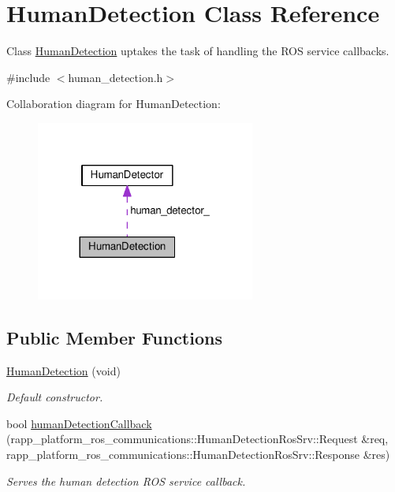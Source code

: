 \hypertarget{classHumanDetection}{\section{Human\-Detection Class Reference}
\label{classHumanDetection}
}


Class \hyperlink{classHumanDetection}{Human\-Detection} uptakes the task of handling the R\-O\-S service callbacks.  




{\ttfamily \#include $<$human\-\_\-detection.\-h$>$}



Collaboration diagram for Human\-Detection\-:
\nopagebreak
\begin{figure}[H]
\begin{center}
\leavevmode
\includegraphics[width=204pt]{classHumanDetection__coll__graph}
\end{center}
\end{figure}
\subsection*{Public Member Functions}
\begin{DoxyCompactItemize}
\item 
\hyperlink{classHumanDetection_a81054415c4dbe7f9f13789f10075b322}{Human\-Detection} (void)
\begin{DoxyCompactList}\small\item\em Default constructor. \end{DoxyCompactList}\item 
bool \hyperlink{classHumanDetection_a11abc6148670a8306b4a182bddef3140}{human\-Detection\-Callback} (rapp\-\_\-platform\-\_\-ros\-\_\-communications\-::\-Human\-Detection\-Ros\-Srv\-::\-Request \&req, rapp\-\_\-platform\-\_\-ros\-\_\-communications\-::\-Human\-Detection\-Ros\-Srv\-::\-Response \&res)
\begin{DoxyCompactList}\small\item\em Serves the human detection R\-O\-S service callback. \end{DoxyCompactList}\end{DoxyCompactItemize}
